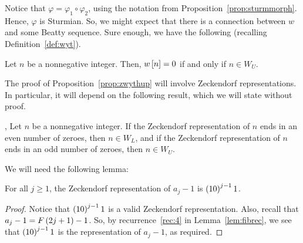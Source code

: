 \documentclass[english,12pt]{article}
\begin{document}
Notice that $\varphi=\varphi_1\circ\varphi_2$, using the notation from Proposition~\ref{prop:sturmmorph}.  Hence, $\varphi$ is Sturmian.  So, we might expect that there is a connection between $w$ and some Beatty sequence.  Sure enough, we have the following (recalling Definition~\ref{def:wyt}).
\begin{prop}\label{prop:zwythup}
Let $n$ be a nonnegative integer.  Then, $w\left[n\right]=0$ if and only if $n\in W_U$.
\end{prop}
The proof of Proposition~\ref{prop:zwythup} will involve Zeckendorf representations.
In particular, it will depend on the following result, which we will state without proof.
\begin{prop}\label{prop:zeckwyt}\cite{oeis201}, \cite{oeis1950}
Let $n$ be a nonnegative integer.  If the Zeckendorf representation of $n$ ends in an even number of zeroes, then $n\in W_L$, and if the Zeckendorf representation of $n$ ends in an odd number of zeroes, then $n\in W_U$.
\end{prop}
We will need the following lemma:
\begin{lemma}\label{lem:altzeck}
For all $j\geq1$, the Zeckendorf representation of $a_j-1$ is $\left(10\right)^{j-1}1$.
\end{lemma}
\begin{proof}
Notice that $\left(10\right)^{j-1}1$ is a valid Zeckendorf representation.  Also, recall that $a_j-1=F\left(2j+1\right)-1$.  So, by recurrence~\ref{rec:4} in Lemma~\ref{lem:fibrec}, we see that $\left(10\right)^{j-1}1$ is the representation of $a_j-1$, as required.
\end{proof}
\end{document}
